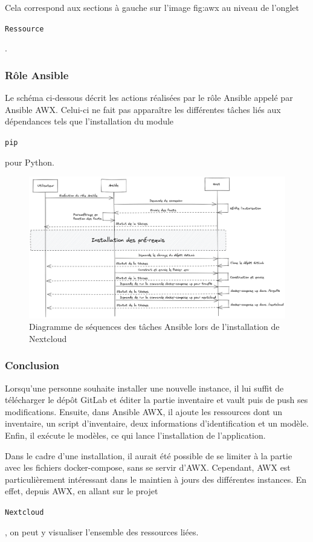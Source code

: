 \documentclass[12pt]{article}
\begin{document}
Cela correspond aux sections à gauche sur l'image \refname{fig:awx} au niveau de l'onglet \begin{code}\texttt{Ressource}\end{code}.

\subsubsection{Rôle \gls{Ansible}}
Le schéma ci-dessous décrit les actions réalisées par le rôle \gls{Ansible} appelé par \gls{Ansible} AWX. 
Celui-ci ne fait pas apparaître les différentes tâches liés aux dépendances tels que l'installation du module \begin{code}\texttt{pip}\end{code} pour Python.

\begin{figure}[!ht]
    \centering
    \includegraphics[width=\textwidth]{src/graph_ansible_nextcloud.png}
    \caption{Diagramme de séquences des tâches \gls{Ansible} lors de l'installation de \gls{Nextcloud}}
    \label{fig:nextcloud_ansible}
\end{figure}

\newpage
\subsubsection{Conclusion}
Lorsqu'une personne souhaite installer une nouvelle instance, il lui suffit de télécharger le dépôt \gls{GitLab} et éditer la partie inventaire et vault puis de push ses modifications. 
Ensuite, dans \gls{Ansible} AWX, il ajoute les ressources dont un inventaire, un script d'inventaire, deux informations d'identification et un modèle. 
Enfin, il exécute le modèles, ce qui lance l'installation de l'application.

Dans le cadre d'une installation, il aurait été possible de se limiter à la partie avec les fichiers docker-compose, sans se servir d'AWX. 
Cependant, AWX est particulièrement intéressant dans le maintien à jours des différentes instances. 
En effet, depuis AWX, en allant sur le projet \begin{code}\texttt{\gls{Nextcloud}}\end{code}, on peut y visualiser l'ensemble des ressources liées.
\end{document}
